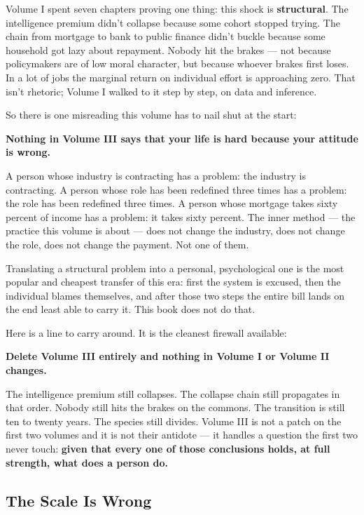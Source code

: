 \documentclass[11pt,a4paper]{article}
\begin{document}
Volume I spent seven chapters proving one thing: this shock is \textbf{structural}. The intelligence premium didn't collapse because some cohort stopped trying. The chain from mortgage to bank to public finance didn't buckle because some household got lazy about repayment. Nobody hit the brakes --- not because policymakers are of low moral character, but because whoever brakes first loses. In a lot of jobs the marginal return on individual effort is approaching zero. That isn't rhetoric; Volume I walked to it step by step, on data and inference.

So there is one misreading this volume has to nail shut at the start:

\textbf{Nothing in Volume III says that your life is hard because your attitude is wrong.}

A person whose industry is contracting has a problem: the industry is contracting. A person whose role has been redefined three times has a problem: the role has been redefined three times. A person whose mortgage takes sixty percent of income has a problem: it takes sixty percent. The inner method --- the practice this volume is about --- does not change the industry, does not change the role, does not change the payment. Not one of them.

Translating a structural problem into a personal, psychological one is the most popular and cheapest transfer of this era: first the system is excused, then the individual blames themselves, and after those two steps the entire bill lands on the end least able to carry it. This book does not do that.

Here is a line to carry around. It is the cleanest firewall available:

\textbf{Delete Volume III entirely and nothing in Volume I or Volume II changes.}

The intelligence premium still collapses. The collapse chain still propagates in that order. Nobody still hits the brakes on the commons. The transition is still ten to twenty years. The species still divides. Volume III is not a patch on the first two volumes and it is not their antidote --- it handles a question the first two never touch: \textbf{given that every one of those conclusions holds, at full strength, what does a person do.}

\subsection{The Scale Is Wrong}
\end{document}
